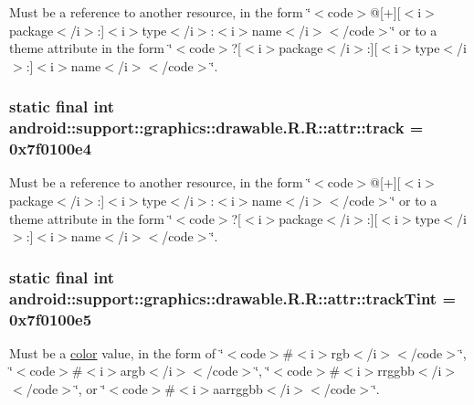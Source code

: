 Must be a reference to another resource, in the form \char`\"{}$<$code$>$@\mbox{[}+\mbox{]}\mbox{[}$<$i$>$package$<$/i$>$:\mbox{]}$<$i$>$type$<$/i$>$:$<$i$>$name$<$/i$>$$<$/code$>$\char`\"{} or to a theme attribute in the form \char`\"{}$<$code$>$?\mbox{[}$<$i$>$package$<$/i$>$:\mbox{]}\mbox{[}$<$i$>$type$<$/i$>$:\mbox{]}$<$i$>$name$<$/i$>$$<$/code$>$\char`\"{}. \hypertarget{classandroid_1_1support_1_1graphics_1_1drawable_1_1_r_1_1attr_05a2c97d3c78f9a10b495595ada05f95}{
\subsubsection[{track}]{\setlength{\rightskip}{0pt plus 5cm}static final int android::support::graphics::drawable.R.R::attr::track = 0x7f0100e4}}
\label{classandroid_1_1support_1_1graphics_1_1drawable_1_1_r_1_1attr_05a2c97d3c78f9a10b495595ada05f95}


Must be a reference to another resource, in the form \char`\"{}$<$code$>$@\mbox{[}+\mbox{]}\mbox{[}$<$i$>$package$<$/i$>$:\mbox{]}$<$i$>$type$<$/i$>$:$<$i$>$name$<$/i$>$$<$/code$>$\char`\"{} or to a theme attribute in the form \char`\"{}$<$code$>$?\mbox{[}$<$i$>$package$<$/i$>$:\mbox{]}\mbox{[}$<$i$>$type$<$/i$>$:\mbox{]}$<$i$>$name$<$/i$>$$<$/code$>$\char`\"{}. \hypertarget{classandroid_1_1support_1_1graphics_1_1drawable_1_1_r_1_1attr_83b9d14c57d6283602becfadf708b2d8}{
\subsubsection[{trackTint}]{\setlength{\rightskip}{0pt plus 5cm}static final int android::support::graphics::drawable.R.R::attr::trackTint = 0x7f0100e5}}
\label{classandroid_1_1support_1_1graphics_1_1drawable_1_1_r_1_1attr_83b9d14c57d6283602becfadf708b2d8}


Must be a \hyperlink{classandroid_1_1support_1_1graphics_1_1drawable_1_1_r_1_1color}{color} value, in the form of \char`\"{}$<$code$>$\#$<$i$>$rgb$<$/i$>$$<$/code$>$\char`\"{}, \char`\"{}$<$code$>$\#$<$i$>$argb$<$/i$>$$<$/code$>$\char`\"{}, \char`\"{}$<$code$>$\#$<$i$>$rrggbb$<$/i$>$$<$/code$>$\char`\"{}, or \char`\"{}$<$code$>$\#$<$i$>$aarrggbb$<$/i$>$$<$/code$>$\char`\"{}. 

